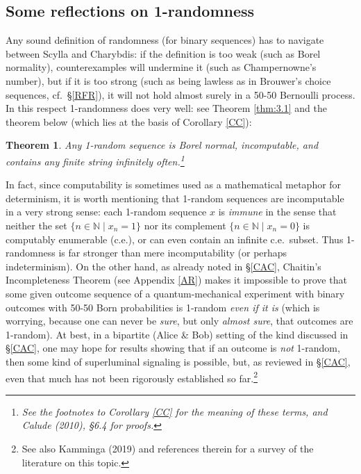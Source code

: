 \documentclass[11pt,a4paper]{article}
\numberwithin{equation}{section}
\newcommand{\N}{{\mathbb N}} \newcommand{\R}{{\mathbb R}}
\newtheorem{theorem}[definition]{Theorem}
\begin{document}
\subsection*{Some reflections on 1-randomness}
Any sound definition of randomness (for binary sequences) has to navigate between Scylla and Charybdis: if the definition is too weak (such as Borel normality), counterexamples will undermine it (such as Champernowne's number), but if it is too strong (such as being lawless as in Brouwer's choice sequences, cf.\ \S\ref{RFR}), it will not hold almost surely in a 50-50 Bernoulli process.
 In this respect 1-randomness does very well: see Theorem \ref{thm:3.1} and the theorem below (which  lies at the basis of Corollary \ref{CC}):
\begin{theorem}\label{PRS}
Any 1-random sequence is  Borel normal, incomputable, and contains any finite string infinitely often.\footnote{See the footnotes to Corollary \ref{CC} for the meaning of these terms, and  Calude (2010), \S 6.4 for proofs. }
\end{theorem}
In fact, since computability is sometimes used  as a mathematical metaphor for determinism, it is worth mentioning that 1-random sequences  are incomputable in a very strong sense: each 1-random sequence $x$  is \emph{immune} in the sense that neither 
the set $\{n\in\N\mid x_n=1\}$ nor its complement  $\{n\in\N\mid x_n=0\}$ is computably enumerable (c.e.), or can even contain an infinite c.e.\ subset. Thus 1-randomness is far stronger than mere incomputability (or perhaps indeterminism).
On the other hand, as already noted in \S\ref{CAC},  Chaitin's Incompleteness Theorem (see Appendix \ref{AR}) makes it impossible to prove that some given outcome sequence of a quantum-mechanical experiment with binary outcomes with 50-50 Born probabilities is 1-random \emph{even if it is} (which is worrying, because one can never be \emph{sure}, but only \emph{almost sure}, that outcomes are 1-random). At best, in a bipartite (Alice \& Bob) setting of the kind discussed in \S\ref{CAC}, one may hope for results showing that if an outcome is \emph{not} 1-random, then some kind of superluminal signaling is possible, but, as reviewed in \S\ref{CAC}, even that much has not been rigorously established so far.\footnote{See also Kamminga (2019) and references therein for a survey of the literature on this topic.} 
\end{document}
